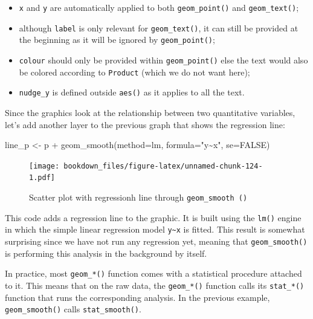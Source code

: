 \documentclass[
]{krantz}
\makeatletter
\newenvironment{Shaded}{\begin{snugshade}}{\end{snugshade}}
\newcommand{\AttributeTok}[1]{\textcolor[rgb]{0.61,0.61,0.61}{#1}}
\newcommand{\ConstantTok}[1]{\textcolor[rgb]{0,0,0}{#1}}
\newcommand{\FunctionTok}[1]{\textcolor[rgb]{0,0,0}{#1}}
\newcommand{\NormalTok}[1]{#1}
\newcommand{\OtherTok}[1]{\textcolor[rgb]{0.37,0.37,0.37}{#1}}
\newcommand{\SpecialCharTok}[1]{\textcolor[rgb]{0,0,0}{#1}}
\newcommand{\StringTok}[1]{\textcolor[rgb]{0.5,0.5,0.5}{#1}}
\providecommand{\tightlist}{%
  \setlength{\itemsep}{0pt}\setlength{\parskip}{0pt}}
\newenvironment{kframe}{%
\medskip{}
\setlength{\fboxsep}{.8em}
 \def\at@end@of@kframe{}%
 \ifinner\ifhmode%
  \def\at@end@of@kframe{\end{minipage}}%
  \begin{minipage}{\columnwidth}%
 \fi\fi%
 \def\FrameCommand##1{\hskip\@totalleftmargin \hskip-\fboxsep
 \colorbox{shadecolor}{##1}\hskip-\fboxsep
     \hskip-\linewidth \hskip-\@totalleftmargin \hskip\columnwidth}%
 \MakeFramed {\advance\hsize-\width
   \@totalleftmargin\z@ \linewidth\hsize
   \@setminipage}}%
 {\par\unskip\endMakeFramed%
 \at@end@of@kframe}
\renewenvironment{Shaded}{\begin{kframe}}{\end{kframe}}
\makeatother
\begin{document}
\begin{itemize}
\tightlist
\item
  \texttt{x} and \texttt{y} are automatically applied to both \texttt{geom\_point()} and \texttt{geom\_text()};
\item
  although \texttt{label} is only relevant for \texttt{geom\_text()}, it can still be provided at the beginning as it will be ignored by \texttt{geom\_point()};
\item
  \texttt{colour} should only be provided within \texttt{geom\_point()} else the text would also be colored according to \texttt{Product} (which we do not want here);
\item
  \texttt{nudge\_y} is defined outside \texttt{aes()} as it applies to all the text.
\end{itemize}

Since the graphics look at the relationship between two quantitative variables, let's add another layer to the previous graph that shows the regression line:

\begin{Shaded}
\begin{Highlighting}[]
\NormalTok{line\_p }\OtherTok{\textless{}{-}}\NormalTok{ p }\SpecialCharTok{+}
  \FunctionTok{geom\_smooth}\NormalTok{(}\AttributeTok{method=}\NormalTok{lm, }\AttributeTok{formula=}\StringTok{"y\textasciitilde{}x"}\NormalTok{, }\AttributeTok{se=}\ConstantTok{FALSE}\NormalTok{)}
\end{Highlighting}
\end{Shaded}

\begin{figure}
\centering
\texttt{[image: bookdown\_files/figure-latex/unnamed-chunk-124-1.pdf]}
\caption{\label{fig:unnamed-chunk-124}Scatter plot with regressionh line through \texttt{geom\_smooth\ ()}}
\end{figure}

This code adds a regression line to the graphic. It is built using the \texttt{lm()} engine in which the simple linear regression model \texttt{y\textasciitilde{}x} is fitted. This result is somewhat surprising since we have not run any regression yet, meaning that \texttt{geom\_smooth()} is performing this analysis in the background by itself.

In practice, most \texttt{geom\_*()} function comes with a statistical procedure attached to it. This means that on the raw data, the \texttt{geom\_*()} function calls its \texttt{stat\_*()} function that runs the corresponding analysis. In the previous example, \texttt{geom\_smooth()} calls \texttt{stat\_smooth()}.
\end{document}
